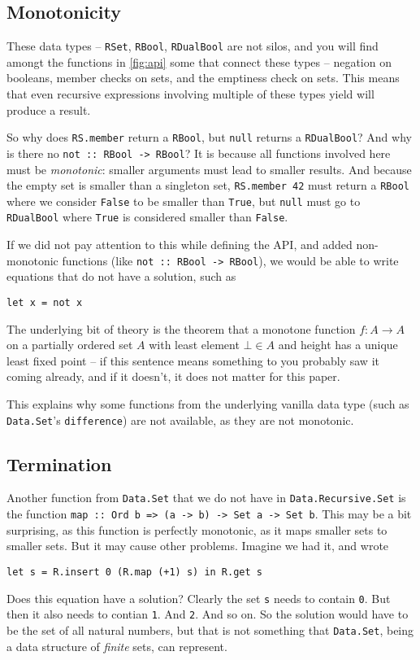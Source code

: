 \documentclass[manuscript,screen,acmsmall]{acmart}
\begin{document}
\subsection{Monotonicity}

These data types -- \verb|RSet|, \verb|RBool|, \verb|RDualBool| are not silos, and you will find amongt the functions in \cref{fig:api} some that connect these types -- negation on booleans, member checks on sets, and the emptiness check on sets.
This means that even recursive expressions involving multiple of these types yield will produce a result.

So why does \verb|RS.member| return a \verb|RBool|, but \verb|null| returns a \verb|RDualBool|? And why is there no \verb|not :: RBool -> RBool|? It is because all functions involved here must be \emph{monotonic}: smaller arguments must lead to smaller results. And because the empty set is smaller than a singleton set, \verb|RS.member 42| must return a \verb|RBool| where we consider \verb|False| to be smaller than \verb|True|, but \verb|null| must go to \verb|RDualBool| where \verb|True| is considered smaller than \verb|False|.

If we did not pay attention to this while defining the API, and added non-monotonic functions (like \verb|not :: RBool -> RBool|), we would be able to write equations that do not have a solution, such as
\begin{verbatim}
let x = not x
\end{verbatim}

The underlying bit of theory is the theorem that a monotone function $f : A \to A$ on a partially ordered set $A$ with least element $\bot \in A$ and height has a unique least fixed point -- if this sentence means something to you probably saw it coming already, and if it doesn't, it does not matter for this paper.

This explains why some functions from the underlying vanilla data type (such as \verb|Data.Set|'s \verb|difference|) are not available, as they are not monotonic.

\subsection{Termination}

Another function from \verb|Data.Set| that we do not have in \verb|Data.Recursive.Set| is the function \verb|map :: Ord b => (a -> b) -> Set a -> Set b|. This may be a bit surprising, as this function is perfectly monotonic, as it maps smaller sets to smaller sets. But it may cause other problems. Imagine we had it, and wrote
\begin{verbatim}
let s = R.insert 0 (R.map (+1) s) in R.get s
\end{verbatim}
Does this equation have a solution? Clearly the set \verb|s| needs to contain \verb|0|. But then it also needs to contian \verb|1|. And \verb|2|. And so on. So the solution would have to be the set of all natural numbers, but that is not something that \verb|Data.Set|, being a data structure of \emph{finite} sets, can represent.
\end{document}
